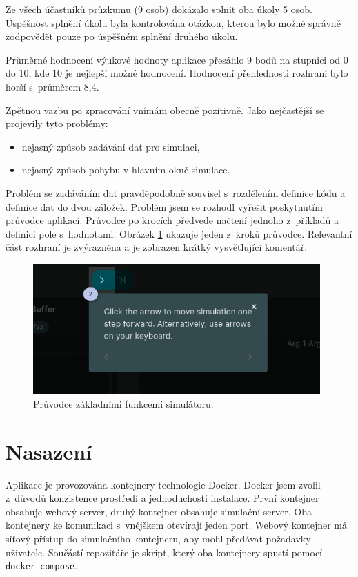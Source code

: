 Ze všech účastníků průzkumu (9 osob) dokázalo splnit oba úkoly 5 osob.
Úspěšnost splnění úkolu byla kontrolována otázkou, kterou bylo možné správně zodpovědět pouze po úspěšném splnění druhého úkolu.

Průměrné hodnocení výukové hodnoty aplikace přesáhlo 9 bodů na stupnici od 0 do 10, kde 10 je nejlepší možné hodnocení.
Hodnocení přehlednosti rozhraní bylo horší s~průměrem 8,4.

Zpětnou vazbu po zpracování vnímám obecně pozitivně.
Jako nejčastější se projevily tyto problémy:
\begin{itemize}
    \item nejasný způsob zadávání dat pro simulaci,
    \item nejasný způsob pohybu  v hlavním okně simulace.
\end{itemize}

Problém se zadáváním dat pravděpodobně souvisel s~rozdělením definice kódu a definice dat do dvou záložek.
Problém jsem se rozhodl vyřešit poskytnutím průvodce aplikací.
Průvodce po krocích předvede načtení jednoho z~příkladů a definici pole s~hodnotami.
Obrázek \ref{walkthrough} ukazuje jeden z~kroků průvodce.
Relevantní část rozhraní je zvýrazněna a je zobrazen krátký vysvětlující komentář. 

\begin{figure}[hbtp]
\centering
    \includegraphics[width=11cm]{obrazky-figures/impl/Walkthrough.png}
    \caption{Průvodce základními funkcemi simulátoru.} 
    \label{walkthrough}
\end{figure}


\section{Nasazení}

Aplikace je provozována kontejnery technologie Docker.
Docker jsem zvolil z~důvodů konzistence prostředí a jednoduchosti instalace.
První kontejner obsahuje webový server, druhý kontejner obsahuje simulační server.
Oba kontejnery ke komunikaci s~vnějškem otevírají jeden port.
Webový kontejner má síťový přístup do simulačního kontejneru, aby mohl předávat požadavky uživatele.
Součástí repozitáře je skript, který oba kontejnery spustí pomocí \texttt{docker-compose}.

